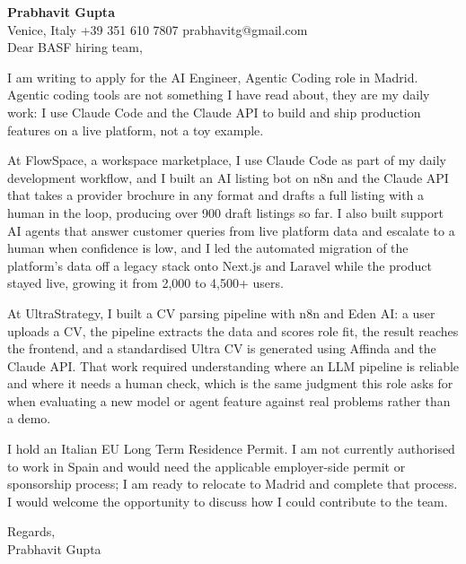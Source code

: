 \documentclass[a4paper,10.5pt]{article}
\begin{document}
\textbf{Prabhavit Gupta}\\
Venice, Italy \textbar{} +39 351 610 7807 \textbar{} prabhavitg@gmail.com\\[10pt]
Dear BASF hiring team,

I am writing to apply for the AI Engineer, Agentic Coding role in Madrid. Agentic coding tools are not something I have read about, they are my daily work: I use Claude Code and the Claude API to build and ship production features on a live platform, not a toy example.

At FlowSpace, a workspace marketplace, I use Claude Code as part of my daily development workflow, and I built an AI listing bot on n8n and the Claude API that takes a provider brochure in any format and drafts a full listing with a human in the loop, producing over 900 draft listings so far. I also built support AI agents that answer customer queries from live platform data and escalate to a human when confidence is low, and I led the automated migration of the platform's data off a legacy stack onto Next.js and Laravel while the product stayed live, growing it from 2,000 to 4,500+ users.

At UltraStrategy, I built a CV parsing pipeline with n8n and Eden AI: a user uploads a CV, the pipeline extracts the data and scores role fit, the result reaches the frontend, and a standardised Ultra CV is generated using Affinda and the Claude API. That work required understanding where an LLM pipeline is reliable and where it needs a human check, which is the same judgment this role asks for when evaluating a new model or agent feature against real problems rather than a demo.

I hold an Italian EU Long Term Residence Permit. I am not currently authorised to work in Spain and would need the applicable employer-side permit or sponsorship process; I am ready to relocate to Madrid and complete that process. I would welcome the opportunity to discuss how I could contribute to the team.

Regards,\\
Prabhavit Gupta
\end{document}
